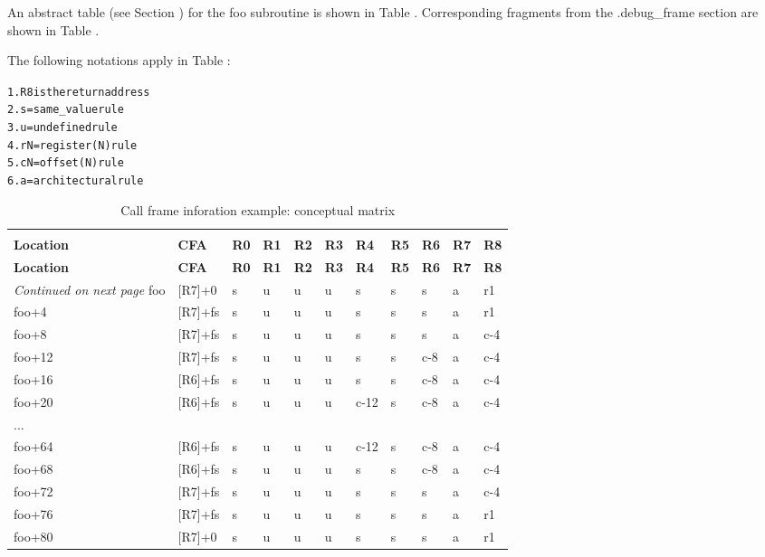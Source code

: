 An abstract table 
(see Section ) 
for the foo subroutine
is shown in 
Table .
Corresponding fragments from the
.debug\_frame section are shown in 
Table .

The following notations apply in 
Table :

\begin{alltt}
1. R8 is the return address
2. s = same\_value rule
3. u = undefined rule
4. rN = register(N) rule
5. cN = offset(N) rule
6. a = architectural rule
\end{alltt}

\begin{centering}
\setlength{\extrarowheight}{0.1cm}
\begin{longtable}{lllllllllll}
  \caption{Call frame inforation example: conceptual matrix} \label{tab:callframeinformationexampleconceptualmatrix} \\
  \hline \\ \bfseries Location & \bfseries CFA & \bfseries R0 & \bfseries R1 & \bfseries R2 & \bfseries R3 & \bfseries R4 & \bfseries R5 & \bfseries R6 & \bfseries R7 & \bfseries R8 \\ \hline
\endfirsthead
  \bfseries Location &\bfseries CFA &\bfseries R0 & \bfseries R1 & \bfseries R2 &\bfseries R3 &\bfseries R4 &\bfseries R5 &\bfseries R6 &\bfseries R7 &\bfseries R8\\ \hline
\endhead
  \hline \emph{Continued on next page}
\endfoot
  \hline
\endlastfoot
foo&[R7]+0&s&u&u&u&s&s&s&a&r1 \\
foo+4&[R7]+fs&s&u&u&u&s&s&s&a&r1 \\
foo+8&[R7]+fs&s&u&u&u&s&s&s&a&c-4 \\
foo+12&[R7]+fs&s&u&u&u&s&s&c-8&a&c-4 \\
foo+16&[R6]+fs&s&u&u&u&s&s&c-8&a&c-4 \\
foo+20&[R6]+fs&s&u&u&u&c-12&s&c-8&a&c-4 \\
...&&&&&&&&&& \\
foo+64&[R6]+fs&s&u&u&u&c-12&s&c-8&a&c-4 \\
foo+68&[R6]+fs&s&u&u&u&s&s&c-8&a&c-4  \\
foo+72&[R7]+fs&s&u&u&u&s&s&s&a&c-4  \\
foo+76&[R7]+fs&s&u&u&u&s&s&s&a&r1 \\
foo+80&[R7]+0&s&u&u&u&s&s&s&a&r1 \\
\end{longtable}
\end{centering}


